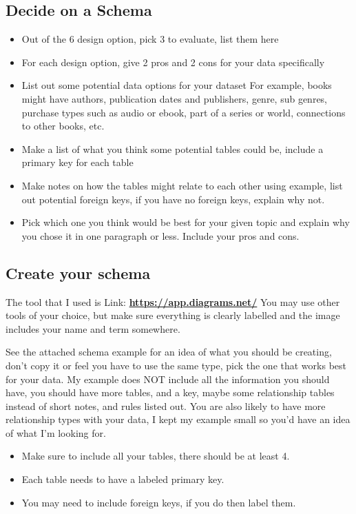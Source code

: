 \documentclass[12pt]{article}
\begin{document}
\subsection*{Decide on a Schema}
    \begin{itemize}
        \item Out of the 6 design option, pick 3 to evaluate, list them here
        \item For each design option, give 2 pros and 2 cons for your data specifically
        \item List out some potential data options for your dataset
            For example, books might have authors, publication dates and publishers, genre, sub genres, purchase types such as audio or ebook, part of a series or world, connections to other books, etc.
        \item Make a list of what you think some potential tables could be, include a primary key for each table
        \item Make notes on how the tables might relate to each other using example, list out potential foreign keys, if you have no foreign keys, explain why not.
        \item Pick which one you think would be best for your given topic and explain why you chose it in one paragraph or less. Include your pros and cons.
    \end{itemize}

\subsection*{Create your schema}

The tool that I used is Link: \href{https://app.diagrams.net/}{\textbf{https://app.diagrams.net/}} 
You may use other tools of your choice, but make sure everything is clearly labelled and the image includes your name and term somewhere.

See the attached schema example for an idea of what you should be creating, don't copy it or feel you have to use the same type, pick the one that works best for your data. My example does NOT include all the information you should have, you should have more tables, and a key, maybe some relationship tables instead of short notes, and rules listed out. You are also likely to have more relationship types with your data, I kept my example small so you'd have an idea of what I'm looking for.

\begin{itemize}
    \item Make sure to include all your tables, there should be at least 4.  
    \item Each table needs to have a labeled primary key.  
    \item You may need to include foreign keys, if you do then label them.
\end{itemize}
\end{document}
